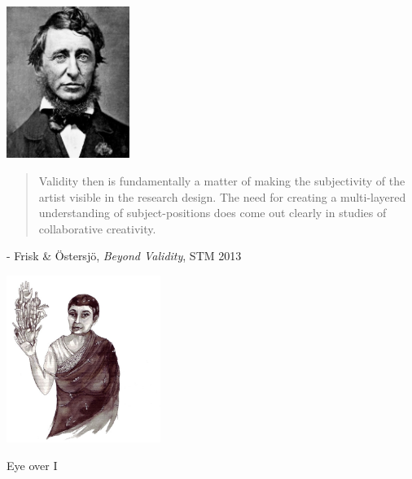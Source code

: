\documentclass{beamer}
\begin{document}
\begin{frame}
  \begin{center}
    \vspace{.2cm}
    \includegraphics[width=4cm]{./img/thoreau.jpg}
  \end{center}
\end{frame}

\begin{frame}
  \begin{quote}
    Validity then is fundamentally a matter of making the subjectivity of the artist visible in the research design. The need for creating a multi-layered understanding of subject-positions does come out clearly in studies of collaborative creativity.
  \end{quote}
  \begin{flushright}
    \small{- Frisk \& Östersjö, \emph{Beyond Validity}, STM 2013}
  \end{flushright}
\end{frame}

\begin{frame}
  \begin{center}
    \vspace{.2cm}
    \includegraphics[width=5cm]{./img/spivak.jpg}
  \end{center}
\end{frame}

\begin{frame}
  \begin{center}
    {\huge \color{white} Eye over I}
  \end{center}
\end{frame}
\end{document}
